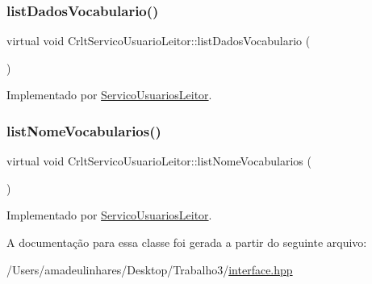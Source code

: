 \subsubsection{\texorpdfstring{list\+Dados\+Vocabulario()}{listDadosVocabulario()}}
{\footnotesize\ttfamily virtual void Crlt\+Servico\+Usuario\+Leitor\+::list\+Dados\+Vocabulario (\begin{DoxyParamCaption}{ }\end{DoxyParamCaption})\hspace{0.3cm}{\ttfamily [pure virtual]}}



Implementado por \mbox{\hyperlink{class_servico_usuarios_leitor_a4f533d318634c95d3f756a45c7613047}{Servico\+Usuarios\+Leitor}}.

\mbox{\label{class_crlt_servico_usuario_leitor_acfe203ebb5de6884bd4eb5d6167c781f}} 
\subsubsection{\texorpdfstring{list\+Nome\+Vocabularios()}{listNomeVocabularios()}}
{\footnotesize\ttfamily virtual void Crlt\+Servico\+Usuario\+Leitor\+::list\+Nome\+Vocabularios (\begin{DoxyParamCaption}{ }\end{DoxyParamCaption})\hspace{0.3cm}{\ttfamily [pure virtual]}}



Implementado por \mbox{\hyperlink{class_servico_usuarios_leitor_a376f7cdbdea50d9a01ce611e79d346c4}{Servico\+Usuarios\+Leitor}}.



A documentação para essa classe foi gerada a partir do seguinte arquivo\+:\begin{DoxyCompactItemize}
\item 
/\+Users/amadeulinhares/\+Desktop/\+Trabalho3/\mbox{\hyperlink{interface_8hpp}{interface.\+hpp}}\end{DoxyCompactItemize}
